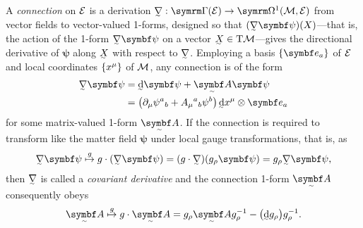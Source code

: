 A \emph{connection} on $\cal E$ is a derivation\footnotemark{} $\ts\nabla : \secs(\cal E) \to \forms^1(\cal M, \cal E)$ from vector fields to vector-valued 1-forms, designed so that $(\ts\nabla\bm\psi)(X)$---that is, the action of the 1-form $\ts\nabla\bm\psi$ on a vector $\ts X \in \T\cal M$---gives the directional derivative of $\bm\psi$ along $\ts X$ with respect to $\ts\nabla$.
Employing a basis $\qty{\bm e_a}$ of $\cal E$ and local coordinates $\qty{x^\mu}$ of $\cal M$, any connection is of the form
\begin{align}
	\ts\nabla \bm\psi &= \ts\dd\bm\psi + \tsbm A\bm\psi
\\	&= \qty(\partial_\mu\psi^a{}_b + A_\mu{}^a{}_b\psi^b) \, \ts\dd x^\mu \otimes \bm e_a
\end{align}
for some matrix-valued 1-form $\tsbm A$.
If the connection is required to transform like the matter field $\bm\psi$ under local gauge transformations, that is, as
\begin{align}
	\ts\nabla\bm\psi \overset{g}{\mapsto} g\cdot(\ts\nabla\bm\psi)
	= (g\cdot\ts\nabla)(g_\rho\bm\psi)
	= g_\rho\ts\nabla\bm\psi
,\end{align}
then $\ts\nabla$ is called a \emph{covariant derivative} and the connection 1-form $\tsbm A$ consequently obeys
\begin{align}
	\tsbm A \overset{g}{\mapsto} g\cdot\tsbm A = g_\rho\tsbm A g_\rho^{-1} - \qty(\ts\dd g_\rho)g_\rho^{-1}
.\end{align}

